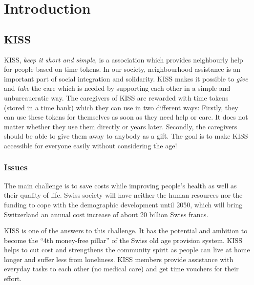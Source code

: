 \documentclass[12pt]{report}
\begin{document}
\tableofcontents
\newpage

\sectionfont{\scshape}



\chapter{Introduction}

\section{KISS}
KISS, \emph{keep it short and simple}, is a association which provides neighbourly help for people based on time tokens.
In our society, neighbourhood assistance is an important part of social integration and solidarity. KISS makes it possible to \emph{give} and \emph{take} the care which is needed by supporting each other in a simple and unbureaucratic way. The caregivers of KISS are rewarded with time tokens (stored in a time bank) which they can use in two different ways: Firstly, they can use these tokens for themselves as soon as they need help or care. It does not matter whether they use them directly or years later. Secondly, the caregivers should be able to give them away to anybody as a gift.
The goal is to make KISS accessible for everyone easily without considering the age!

\subsection*{Issues}

The main challenge is to save costs while improving people's health as well as their quality of life.
Swiss society will have neither the human resources nor the funding to
cope with the demographic development until 2050, which will bring
Switzerland an annual cost increase of about 20 billion Swiss francs.

KISS is one of the answers to this challenge. It has the potential and ambition to
become the ``4th money-free pillar'' of the Swiss old age provision system.
KISS helps to cut cost and strengthens the community spirit as people can live at
home longer and suffer less from loneliness.
KISS members provide assistance with everyday tasks to each other (no medical care) and get
time vouchers for their effort.
\end{document}
